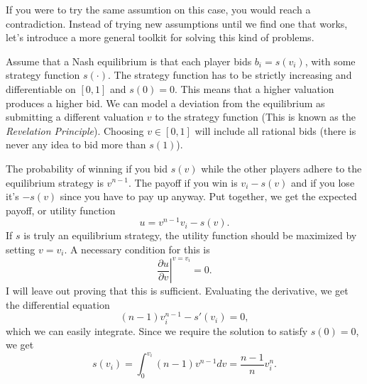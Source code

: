 \documentclass[12pt]{article}
\begin{document}
If you were to try the same assumtion on this case, you would reach a contradiction. Instead of trying new assumptions until we find one that works, let's introduce a more general toolkit for solving this kind of problems.

Assume that a Nash equilibrium is that each player bids $b_i = s(v_i)$, with some strategy function $s(\cdot)$. The strategy function has to be strictly increasing and differentiable on $[0, 1]$ and $s(0) = 0$. This means that a higher valuation produces a higher bid. We can model a deviation from the equilibrium as submitting a different valuation $v$ to the strategy function (This is known as the \emph{Revelation Principle}). Choosing $v \in [0, 1]$ will include all rational bids (there is never any idea to bid more than $s(1)$).

The probability of winning if you bid $s(v)$ while the other players adhere to the equilibrium strategy is $v^{n-1}$. The payoff if you win is $v_i - s(v)$ and if you lose it's $-s(v)$ since you have to pay up anyway. Put together, we get the expected payoff, or utility function
$$
u = v^{n-1}v_i - s(v).
$$
If $s$ is truly an equilibrium strategy, the utility function should be maximized by setting $v=v_i$. A necessary condition for this is
$$
\left. \frac{\partial u}{\partial v} \right|^{v=v_i} = 0.
$$
I will leave out proving that this is sufficient. Evaluating the derivative, we get the differential equation
$$
(n-1)v_i^{n-1} - s'(v_i) = 0,
$$
which we can easily integrate. Since we require the solution to satisfy $s(0) = 0$, we get
$$
s(v_i) = \int_0^{v_i} (n-1)v^{n-1} dv = \frac{n-1}{n}v_i^n.
$$
\end{document}
